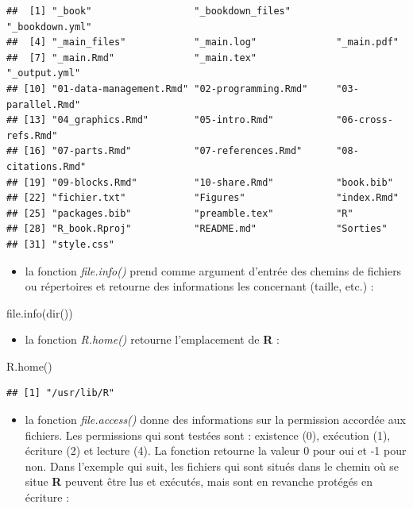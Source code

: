\documentclass[
]{book}
\newenvironment{Shaded}{\begin{snugshade}}{\end{snugshade}}
\newcommand{\FunctionTok}[1]{\textcolor[rgb]{0.00,0.00,0.00}{#1}}
\newcommand{\NormalTok}[1]{#1}
\providecommand{\tightlist}{%
  \setlength{\itemsep}{0pt}\setlength{\parskip}{0pt}}
\theoremstyle{definition}
\theoremstyle{definition}
\theoremstyle{definition}
\theoremstyle{definition}
\theoremstyle{remark}
\begin{document}
\begin{verbatim}
##  [1] "_book"                  "_bookdown_files"        "_bookdown.yml"         
##  [4] "_main_files"            "_main.log"              "_main.pdf"             
##  [7] "_main.Rmd"              "_main.tex"              "_output.yml"           
## [10] "01-data-management.Rmd" "02-programming.Rmd"     "03-parallel.Rmd"       
## [13] "04_graphics.Rmd"        "05-intro.Rmd"           "06-cross-refs.Rmd"     
## [16] "07-parts.Rmd"           "07-references.Rmd"      "08-citations.Rmd"      
## [19] "09-blocks.Rmd"          "10-share.Rmd"           "book.bib"              
## [22] "fichier.txt"            "Figures"                "index.Rmd"             
## [25] "packages.bib"           "preamble.tex"           "R"                     
## [28] "R_book.Rproj"           "README.md"              "Sorties"               
## [31] "style.css"
\end{verbatim}

\begin{itemize}
\tightlist
\item
  la fonction \emph{file.info()} prend comme argument d'entrée des chemins de fichiers ou répertoires et retourne des informations les concernant (taille, etc.) :
\end{itemize}

\begin{Shaded}
\begin{Highlighting}[]
\FunctionTok{file.info}\NormalTok{(}\FunctionTok{dir}\NormalTok{())}
\end{Highlighting}
\end{Shaded}

\begin{itemize}
\tightlist
\item
  la fonction \emph{R.home()} retourne l'emplacement de \textbf{R} :
\end{itemize}

\begin{Shaded}
\begin{Highlighting}[]
\FunctionTok{R.home}\NormalTok{()}
\end{Highlighting}
\end{Shaded}

\begin{verbatim}
## [1] "/usr/lib/R"
\end{verbatim}

\begin{itemize}
\tightlist
\item
  la fonction \emph{file.access()} donne des informations sur la permission accordée aux fichiers. Les permissions qui sont testées sont : existence (0), exécution (1), écriture (2) et lecture (4). La fonction retourne la valeur 0 pour oui et -1 pour non. Dans l'exemple qui suit, les fichiers qui sont situés dans le chemin où se situe \textbf{R} peuvent être lus et exécutés, mais sont en revanche protégés en écriture :
\end{itemize}
\end{document}
